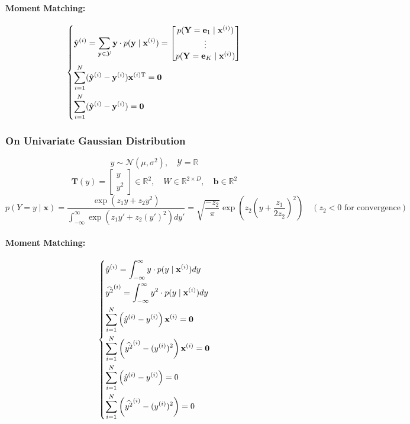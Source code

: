\documentclass{article}
\begin{document}
\paragraph{Moment Matching:}
\[
    \begin{dcases}
        \hat{\mathbf{y}}^{(i)} = \sum_{\mathbf{y} \in \mathcal{Y}} \mathbf{y} \cdot p(\mathbf{y} \mid \mathbf{x}^{(i)}) = \begin{bmatrix} p(\mathbf{Y}=\mathbf{e}_1 \mid \mathbf{x}^{(i)}) \\ \vdots \\ p(\mathbf{Y}=\mathbf{e}_K \mid \mathbf{x}^{(i)}) \end{bmatrix} \\
        \sum_{i=1}^N (\hat{\mathbf{y}}^{(i)} - \mathbf{y}^{(i)}) \mathbf{x}^{(i)\mathrm{T}} = \mathbf{0} \\
        \sum_{i=1}^N (\hat{\mathbf{y}}^{(i)} - \mathbf{y}^{(i)}) = \mathbf{0}
    \end{dcases}
\]

\subsubsection{On Univariate Gaussian Distribution}
\[
    y \sim \mathcal{N}(\mu, \sigma^2), \quad \mathcal{Y} = \mathbb{R}
\]
\[
    \mathbf{T}(y) = \begin{bmatrix} y \\ y^2 \end{bmatrix} \in \mathbb{R}^2, \quad W \in \mathbb{R}^{2 \times D}, \quad \mathbf{b} \in \mathbb{R}^2
\]
\[
    p(Y=y \mid \mathbf{x}) = \frac{\exp(z_1 y + z_2 y^2)}{\int_{-\infty}^{\infty} \exp(z_1 y' + z_2 (y')^2) dy'} = \sqrt{\frac{-z_2}{\pi}} \exp\left(z_2\left(y + \frac{z_1}{2z_2}\right)^2\right) \quad (z_2 < 0 \text{ for convergence})
\]
\paragraph{Moment Matching:}
\[
    \begin{dcases}
        \hat{y}^{(i)} = \int_{-\infty}^{\infty} y \cdot p(y \mid \mathbf{x}^{(i)}) dy \\
        \widehat{y^2}^{(i)} = \int_{-\infty}^{\infty} y^2 \cdot p(y \mid \mathbf{x}^{(i)}) dy \\
        \sum_{i=1}^N \left( \hat{y}^{(i)} - y^{(i)} \right) \mathbf{x}^{(i)} = \mathbf{0} \\
        \sum_{i=1}^N \left( \widehat{y^2}^{(i)} - (y^{(i)})^2 \right) \mathbf{x}^{(i)} = \mathbf{0} \\
        \sum_{i=1}^N \left( \hat{y}^{(i)} - y^{(i)} \right) = 0 \\
        \sum_{i=1}^N \left( \widehat{y^2}^{(i)} - (y^{(i)})^2 \right) = 0
    \end{dcases}
\]
\end{document}
